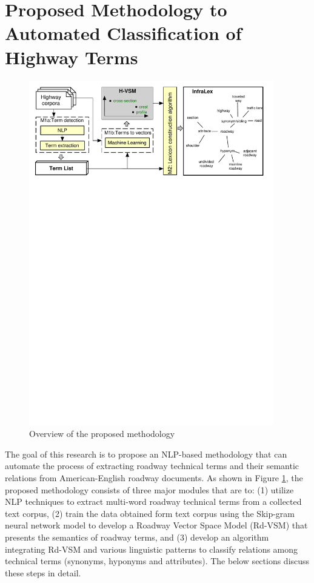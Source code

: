\documentclass[Journal, BackFigs, DoubleSpace]{ascelike}%
\begin{document}
\section{Proposed Methodology to Automated Classification of Highway Terms} \label{sec:RoadLex}
\begin{figure}[t]
	\centering
	\includegraphics[width=0.95\textwidth]{Figure1_overview_methodology}
	\caption{Overview of the proposed methodology}
	\label{fig:framework}
\end{figure}
%
The goal of this research is to propose an NLP-based methodology that can automate the process of extracting roadway technical terms and their semantic relations from American-English roadway documents. As shown in Figure \ref{fig:framework}, the proposed methodology consists of three major modules that are to: (1) utilize NLP techniques to extract multi-word roadway technical terms from a collected text corpus, (2) train the data obtained form text corpus using the Skip-gram neural network model \cite{mikolov13a} to develop a Roadway Vector Space Model (Rd-VSM) that presents the semantics of roadway terms, and (3) develop an algorithm integrating Rd-VSM and various linguistic patterns to classify relations among technical terms (synonyms, hyponyms and attributes). The below sections discuss these steps in detail.
\end{document}
